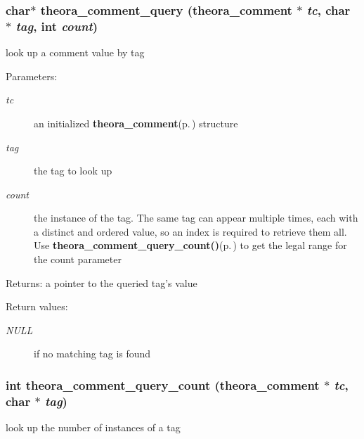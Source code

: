 \subsubsection{\setlength{\rightskip}{0pt plus 5cm}char$\ast$ theora\_\-comment\_\-query ({\bf theora\_\-comment} $\ast$ {\em tc}, char $\ast$ {\em tag}, int {\em count})}\label{theora_8h_a35}


look up a comment value by tag 

\begin{Desc}
\item[Parameters:]
\begin{description}
\item[{\em tc}]an initialized {\bf theora\_\-comment}{\rm (p.\,\pageref{structtheora__comment})} structure \item[{\em tag}]the tag to look up \item[{\em count}]the instance of the tag. The same tag can appear multiple times, each with a distinct and ordered value, so an index is required to retrieve them all. Use {\bf theora\_\-comment\_\-query\_\-count()}{\rm (p.\,\pageref{theora_8h_a36})} to get the legal range for the count parameter \end{description}
\end{Desc}
\begin{Desc}
\item[Returns:]a pointer to the queried tag's value \end{Desc}
\begin{Desc}
\item[Return values:]
\begin{description}
\item[{\em NULL}]if no matching tag is found \end{description}
\end{Desc}
\subsubsection{\setlength{\rightskip}{0pt plus 5cm}int theora\_\-comment\_\-query\_\-count ({\bf theora\_\-comment} $\ast$ {\em tc}, char $\ast$ {\em tag})}\label{theora_8h_a36}


look up the number of instances of a tag 

